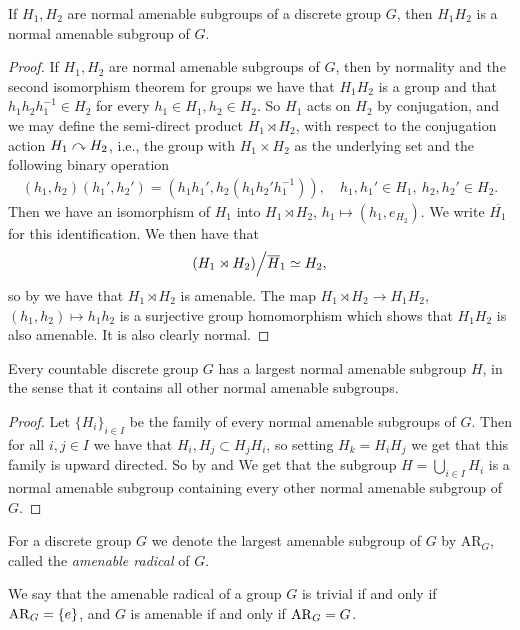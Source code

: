 \begin{lemma}\label{product amenable}
If $H_{1},H_{2}$ are normal amenable subgroups of a discrete group $G$, then ${H_{1}H_{2}}$ is a normal amenable subgroup of $G$.
\begin{proof}
If $H_{1},H_{2}$ are normal amenable subgroups of $G$, then by normality and the second isomorphism theorem for groups we have that $H_1 H_2$ is a group and that $h_{1} h_{2}h_{1}^{-1} \in H_{2}$ for every $h_{1} \in H_{1}, h_{2} \in H_{2}$. So $H_{1}$ acts on $H_{2}$ by conjugation, and we may define the semi-direct product $H_{1} \rtimes H_{2}$, with respect to the conjugation action $H_1 \curvearrowright H_2$, i.e., the group with $H_1 \times H_2$ as the underlying set and the following binary operation 
\begin{align*}
(h_1,h_2) (h_1',h_2') =(h_1 h_1' , h_2 (h_1 h_2' h_1^{-1})), \quad h_1,h_1' \in H_1, \ h_2, h_2' \in H_2.
\end{align*} Then we have an isomorphism of $H_{1}$ into $H_{1} \rtimes H_{2}$, $h_{1} \mapsto (h_{1},e_{H_2})$. We write $\overline{H_1}$ for this identification. We then have that 
\begin{align*}
\left(H_{1} \rtimes H_{2}\right)\Bign/\overline{H}_{1} \simeq H_{2},
\end{align*} 
so by  we have that $H_{1} \rtimes H_{2}$ is amenable. The map $H_{1} \rtimes H_{2} \to {H_{1}H_{2}}$, $(h_{1}, h_{2}) \mapsto h_{1} h_{2}$ is a surjective group homomorphism which shows that $H_{1}H_{2}$ is also amenable. It is also clearly normal.
\end{proof}
\end{lemma}

\begin{proposition}
Every countable discrete group $G$ has a largest normal amenable subgroup $H$, in the sense that it contains all other normal amenable subgroups.
\begin{proof}
Let $\{H_{i}\}_{i \in I}$ be the family of every normal amenable subgroups of $G$. Then for all $i,j \in I$ we have that $H_{i},H_{j} \subset H_{j}H_{i}$, so setting $H_{k}=H_{i}H_{j}$ we get that this family is upward directed. So by  and  We get that the subgroup $\displaystyle H=\bigcup_{i\in I} H_{i}$ is a normal amenable subgroup containing every other normal amenable subgroup of $G$.
\end{proof}
\end{proposition}

\begin{definition}
For a discrete group $G$ we denote the largest amenable subgroup of $G$ by $\text{AR}_{G}$, called the \emph{amenable radical} of $G$.
\end{definition}

We say that the amenable radical of a group $G$ is trivial if and only if $\operatorname{AR}_G=\{e\}$, and $G$ is amenable if and only if $\operatorname{AR}_G=G$.
